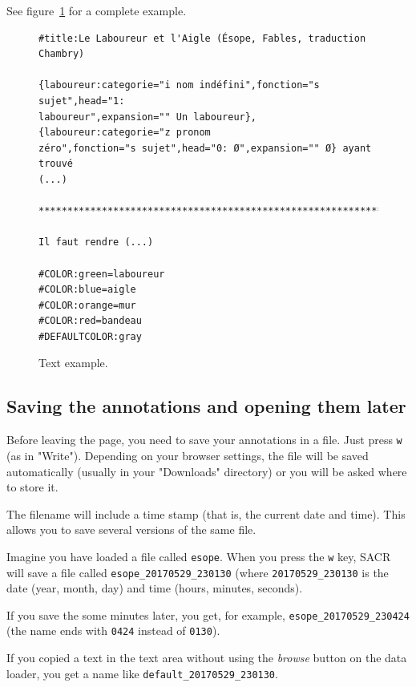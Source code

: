 \documentclass[12pt]{article}
\begin{document}
See figure~\ref{fig-sacr-example-text} for a complete example.

\begin{figure}[tbp]
\begin{mdframed}
\begin{verbatim}
#title:Le Laboureur et l'Aigle (Ésope, Fables, traduction Chambry)

{laboureur:categorie="i nom indéfini",fonction="s sujet",head="1:
laboureur",expansion="" Un laboureur}, {laboureur:categorie="z pronom
zéro",fonction="s sujet",head="0: Ø",expansion="" Ø} ayant trouvé
(...)

************************************************************************

Il faut rendre (...)

#COLOR:green=laboureur
#COLOR:blue=aigle
#COLOR:orange=mur
#COLOR:red=bandeau
#DEFAULTCOLOR:gray
\end{verbatim}
\end{mdframed}
\caption{Text example.}\label{fig-sacr-example-text}
\end{figure}


 \subsection{Saving the annotations and opening them later}

Before leaving the page, you need to save your annotations in a file.  Just
press \verb|w| (as in "Write").  Depending on your browser settings, the file
will be saved automatically (usually in your "Downloads" directory) or you
will be asked where to store it.

The filename will include a time stamp (that is, the current date and time).
This allows you to save several versions of the same file.

Imagine you have loaded a file called \verb|esope|.  When you press the
\verb|w| key, SACR will save a file called \verb|esope_20170529_230130|
(where \verb|20170529_230130| is the date (year, month, day) and time (hours,
minutes, seconds).

If you save the some minutes later, you get, for example,
\verb|esope_20170529_230424| (the name ends with \verb|0424| instead of
\verb|0130|).

If you copied a text in the text area without using the \emph{browse} button
on the data loader, you get a name like \verb|default_20170529_230130|.
\end{document}
